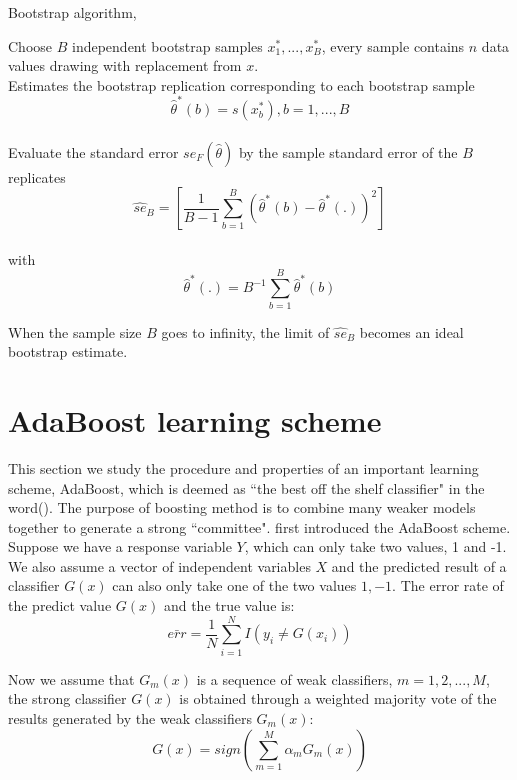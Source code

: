 \begin{algorithm}[H]
	\caption{Bootstrap algorithm, \cite{breiman1996bagging}}\label{alg:bootstrap}
	\nl Choose $B$ independent bootstrap samples $x^*_1,...,x^*_B$, every sample contains $n$ data values drawing with replacement from $x$.\\
	\nl Estimates the bootstrap replication corresponding to each bootstrap sample\\
	$$\hat{\theta}^*(b)=s(x_b^*),b=1,...,B$$\\
	\nl Evaluate the standard error $se_F(\hat{\theta})$ by the sample standard error of the $B$ replicates\\
	
	$$\hat{se}_B=[\frac{1}{B-1}\sum_{b=1}^{B}(\hat{\theta}^*(b)-\hat{\theta}^*(.))^2]$$\\
	with \\
	$$\hat{\theta}^*(.)=B^{-1}\sum_{b=1}^{B}\hat{\theta}^*(b)$$
\end{algorithm}

When the sample size $B$ goes to infinity, the limit of $\hat{se}_B$ becomes an ideal bootstrap estimate.



\section{AdaBoost learning scheme}
This section we study the procedure and properties of an important learning scheme,  AdaBoost,  which is deemed as ``the best off the shelf classifier" in the word(\cite{friedman2000additive}). The purpose of boosting method is to combine many weaker models together to generate a strong ``committee".
\cite{freund1995desicion} first introduced the AdaBoost scheme. Suppose we have a response variable $Y$,  which can only take two values,  1 and -1.  We also assume a vector of independent variables $X$ and the predicted result of a classifier $G(x)$ can also only take one of the two values ${1, -1}$. The error rate of the predict value $G(x)$ and the true value is:
\begin{equation}
\bar{err}=\frac{1}{N}\sum_{i=1}^{N}I(y_i\neq G(x_i))
\end{equation}

Now we assume that $G_m(x)$ is a sequence of weak classifiers,  $m=1, 2, ..., M$, the strong classifier $G(x)$ is obtained through a weighted majority vote of the results generated by the weak classifiers $G_m(x)$:
\begin{equation}
G(x)=sign(\sum_{m=1}^{M}\alpha_m G_m(x))
\end{equation}

